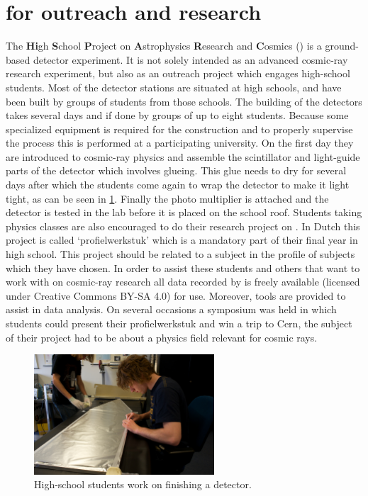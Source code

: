 \section{\hisparc for outreach and research}

The \textbf{Hi}gh \textbf{S}chool \textbf{P}roject on \textbf{A}strophysics \textbf{R}esearch and \textbf{C}osmics (\hisparc) is a ground-based detector experiment. It is not solely intended as an advanced cosmic-ray research experiment, but also as an outreach project which engages high-school students. Most of the \hisparc detector stations are situated at high schools, and have been built by groups of students from those schools. The building of the detectors takes several days and if done by groups of up to eight students. Because some specialized equipment is required for the construction and to properly supervise the process this is performed at a participating university. On the first day they are introduced to cosmic-ray physics and assemble the scintillator and light-guide parts of the detector which involves glueing. This glue needs to dry for several days after which the students come again to wrap the detector to make it light tight, as can be seen in \cref{fig:detector-bouw}. Finally the photo multiplier is attached and the detector is tested in the lab before it is placed on the school roof. Students taking physics classes are also encouraged to do their research project on \hisparc. In Dutch this project is called `profielwerkstuk' which is a mandatory part of their final year in high school. This project should be related to a subject in the profile of subjects which they have chosen. In order to assist these students and others that want to work with on cosmic-ray research all data recorded by \hisparc is freely available (licensed under Creative Commons BY-SA 4.0) for use. Moreover, tools are provided to assist in data analysis. On several occasions a symposium was held in which students could present their profielwerkstuk and win a trip to Cern, the subject of their project had to be about a physics field relevant for cosmic rays.

\begin{figure}
    \centering
    \includegraphics[width=0.6\textwidth]
                    {plots/cosmic-rays/ADL_100352}
    \caption{High-school students work on finishing a detector.}
    \label{fig:detector-bouw}
\end{figure}


